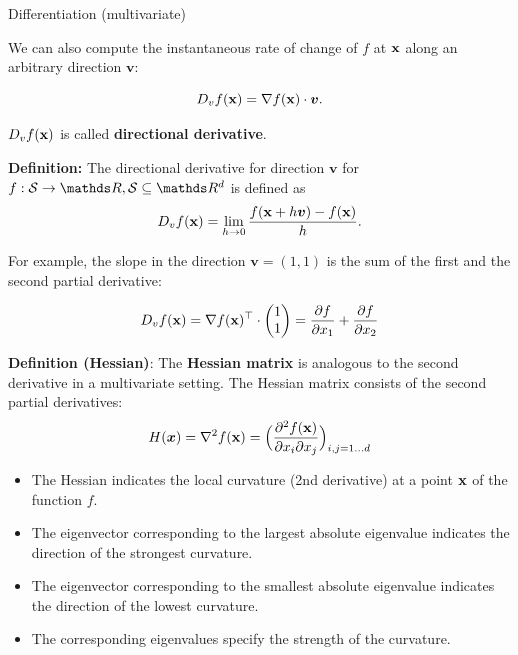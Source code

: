 \begin{vbframe}{Differentiation (multivariate)}
\framebreak 

We can also compute the instantaneous rate of change of $f$ at $\mathbf{x}$ along an arbitrary direction $\bm{v}$: 

$$
D_v f(\mathbf{x}) = \nabla f(\mathbf{x}) \cdot \bm v.
$$


$D_v f(\mathbf{x})$ is called \textbf{directional derivative}. 

\textbf{Definition:} The directional derivative for direction $\bm{v}$ for $f: \mathcal{S} \to \R, \mathcal{S} \subseteq \R^d$ is defined as
 $$
   D_v f(\mathbf{x}) = \lim_{h \to 0} \frac{f(\mathbf{x} + h \bm v) - f(\mathbf{x})}{h}.
 $$

\lz 

For example, the slope in the direction $\bm{v} = (1, 1)$ is the sum of the first and the second partial derivative: 

$$
D_v f(\mathbf{x}) = \nabla f(\mathbf{x})^\top \cdot \begin{pmatrix} 1 \\1\end{pmatrix} = \frac{\partial f}{\partial x_1} + \frac{\partial f}{\partial x_2}
$$


\framebreak

\textbf{Definition (Hessian)}: The \textbf{Hessian matrix} is analogous to the second derivative in a multivariate setting. The Hessian matrix consists of the second partial derivatives:
 \[ H(\boldsymbol{x}) =\nabla^2 f(\mathbf{x}) =
\Bigl(\frac{\partial^2 f(\mathbf{x})}{\partial x_i \partial x_j}\Bigr)_{i,j=1\ldots d}\]
\begin{itemize}
\item The Hessian indicates the local curvature (2nd derivative) at a point $\mathbf{x}$ of the function $f$.
\item The eigenvector corresponding to the largest absolute eigenvalue indicates the direction of the strongest curvature.
\item The eigenvector corresponding to the smallest absolute eigenvalue indicates the direction of the lowest curvature.
\item The corresponding eigenvalues specify the strength of the curvature.
\end{itemize}
\end{vbframe}


\endlecture
